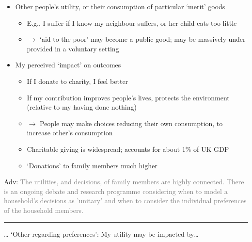\documentclass[]{article}
\providecommand{\tightlist}{%
  \setlength{\itemsep}{0pt}\setlength{\parskip}{0pt}}
\begin{document}
\begin{itemize}
\tightlist
\item
  Other people's utility, or their consumption of particular `merit'
  goods

  \begin{itemize}
  \tightlist
  \item
    E.g., I suffer if I know my neighbour suffers, or her child eats too
    little
  \item
    \(\rightarrow\) `aid to the poor' may become a public good; may be
    massively under-provided in a voluntary setting
  \end{itemize}
\item
  My perceived `impact' on outcomes

  \begin{itemize}
  \tightlist
  \item
    If I donate to charity, I feel better
  \item
    If my contribution improves people's lives, protects the environment
    (relative to my having done nothing)
  \item
    \(\rightarrow\) People may make choices reducing their own
    consumption, to increase other's consumption
  \item
    Charitable giving is widespread; accounts for about 1\% of UK GDP
  \item
    `Donations' to family members much higher
  \end{itemize}
\end{itemize}

\textcolor{RawSienna}{Adv:}
\textcolor{gray}{The utilities, and decisions, of family members are highly connected. There is an ongoing debate and research programme considering when to model a household's decisions as 'unitary' and when to consider the individual preferences of the household members.}

\begin{center}\rule{0.5\linewidth}{\linethickness}\end{center}

\ldots{} `Other-regarding preferences': My utility may be impacted
by\ldots{}
\end{document}
